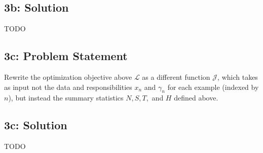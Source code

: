 \documentclass[10pt]{article}
\newcommand{\officialdirections}[1]{{\color{blue} #1}}
\begin{document}
\subsection{3b: Solution}

TODO


\newpage
\officialdirections{
\subsection*{3c: Problem Statement}
Rewrite the optimization objective above $\mathcal{L}$ as a different function $\mathcal{J}$, which takes as input not the data and responsibilities $x_n$ and $\gamma_n$ for each example (indexed by $n$), but instead the summary statistics $N, S, T,$ and $H$ defined above.
}

\subsection{3c: Solution}

TODO
\end{document}

